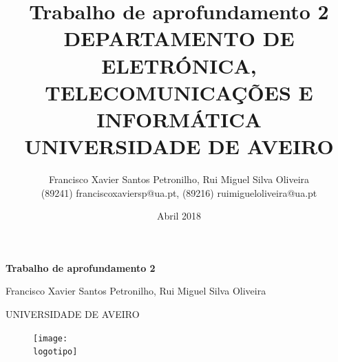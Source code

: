 \documentclass[a4paper,12pt]{report}
\begin{document}

\def\titulo{Trabalho de aprofundamento 2} 
\def\data{Abril 2018} 
\def\autores{Francisco Xavier Santos Petronilho, Rui Miguel Silva Oliveira} 
\def\autorescontactos{(89241) franciscoxaviersp@ua.pt, (89216) ruimigueloliveira@ua.pt} 
\def\departamento{DEPARTAMENTO DE ELETRÓNICA, TELECOMUNICAÇÕES E INFORMÁTICA} 
\def\empresa{UNIVERSIDADE DE AVEIRO} 
\def\logotipo{ua.pdf}


\begin{titlepage} 

\begin{center}

\vspace*{50mm} 

{\Huge\textbf{\titulo}}\\ 
\vspace{13mm} 

{\Large\autores}\\ 
\vspace{15mm}

{\Large \empresa}\\ 
\vspace{10mm} 

\begin{figure}[h]
\center
\texttt{[image: \\logotipo]}
\end{figure}
            
\vspace{30mm} \end{center} 
         

\end{titlepage} 
             

\title{{\Huge\textbf{\titulo}}\\
\vspace{10mm}
{\Large \departamento}\\
\vspace{5mm}
{\LARGE \empresa}} 

\author{\autores \\ \autorescontactos}

\date{\data}

\maketitle
           
\end{document}
